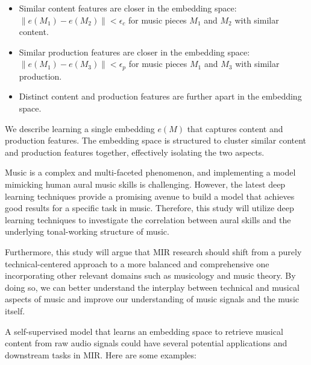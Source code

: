 \begin{itemize}
  \item Similar content features are closer in the embedding space: $\|e(M_1) - e(M_2)\| < \epsilon_c$ for music pieces $M_1$ and $M_2$ with similar content.
  \item Similar production features are closer in the embedding space: $\|e(M_1) - e(M_3)\| < \epsilon_p$ for music pieces $M_1$ and $M_3$ with similar production.
  \item Distinct content and production features are further apart in the embedding space.
\end{itemize}

We describe learning a single embedding $e(M)$ that captures content and production features. The embedding space is structured to cluster similar content and production features together, effectively isolating the two aspects.

Music is a complex and multi-faceted phenomenon, and implementing a model mimicking human aural music skills is challenging. However, the latest deep learning techniques provide a promising avenue to build a model that achieves good results for a specific task in music. Therefore, this study will utilize deep learning techniques to investigate the correlation between aural skills and the underlying tonal-working structure of music.

Furthermore, this study will argue that MIR research should shift from a purely technical-centered approach to a more balanced and comprehensive one incorporating other relevant domains such as musicology and music theory. By doing so, we can better understand the interplay between technical and musical aspects of music and improve our understanding of music signals and the music itself.


A self-supervised model that learns an embedding space to retrieve musical content from raw audio signals could have several potential applications and downstream tasks in MIR. Here are some examples:

